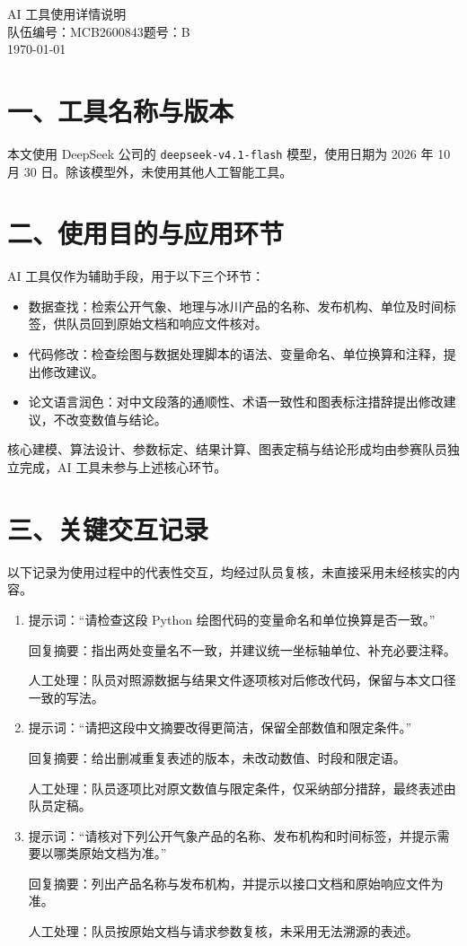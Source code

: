 \documentclass[12pt,a4paper]{ctexart}
\begin{document}
\begin{center}
{\heiti AI 工具使用详情说明}\\[8pt]
{队伍编号：MCB2600843\quad 题号：B}\\[2pt]
{\today}
\end{center}

\vspace{0.5em}

\section*{一、工具名称与版本}
本文使用 DeepSeek 公司的 \texttt{deepseek-v4.1-flash} 模型，使用日期为 2026 年 10 月 30 日。除该模型外，未使用其他人工智能工具。

\section*{二、使用目的与应用环节}
AI 工具仅作为辅助手段，用于以下三个环节：
\begin{itemize}
  \item 数据查找：检索公开气象、地理与冰川产品的名称、发布机构、单位及时间标签，供队员回到原始文档和响应文件核对。
  \item 代码修改：检查绘图与数据处理脚本的语法、变量命名、单位换算和注释，提出修改建议。
  \item 论文语言润色：对中文段落的通顺性、术语一致性和图表标注措辞提出修改建议，不改变数值与结论。
\end{itemize}
核心建模、算法设计、参数标定、结果计算、图表定稿与结论形成均由参赛队员独立完成，AI 工具未参与上述核心环节。

\section*{三、关键交互记录}
以下记录为使用过程中的代表性交互，均经过队员复核，未直接采用未经核实的内容。

\begin{enumerate}
  \item 提示词：“请检查这段 Python 绘图代码的变量命名和单位换算是否一致。”

  回复摘要：指出两处变量名不一致，并建议统一坐标轴单位、补充必要注释。

  人工处理：队员对照源数据与结果文件逐项核对后修改代码，保留与本文口径一致的写法。

  \item 提示词：“请把这段中文摘要改得更简洁，保留全部数值和限定条件。”

  回复摘要：给出删减重复表述的版本，未改动数值、时段和限定语。

  人工处理：队员逐项比对原文数值与限定条件，仅采纳部分措辞，最终表述由队员定稿。

  \item 提示词：“请核对下列公开气象产品的名称、发布机构和时间标签，并提示需要以哪类原始文档为准。”

  回复摘要：列出产品名称与发布机构，并提示以接口文档和原始响应文件为准。

  人工处理：队员按原始文档与请求参数复核，未采用无法溯源的表述。
\end{enumerate}
\end{document}
